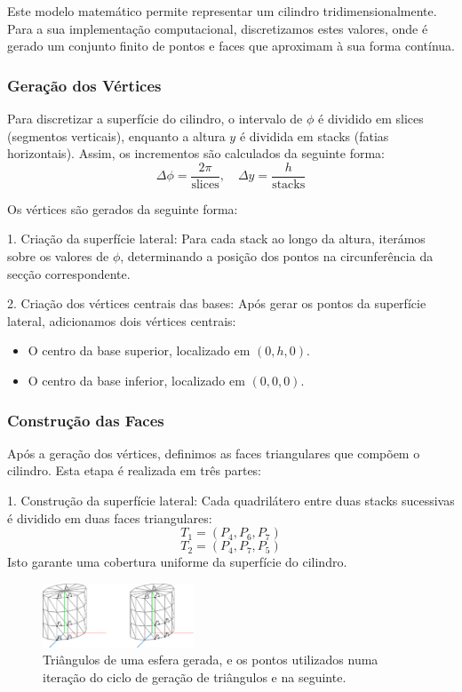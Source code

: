 \documentclass[12pt, a4paper]{article}
\begin{document}
Este modelo matemático permite representar um cilindro tridimensionalmente. Para a sua implementação
computacional, discretizamos estes valores, onde é gerado um conjunto finito de pontos e faces que
aproximam à sua forma contínua.

\subsubsection{Geração dos Vértices}
Para discretizar a superfície do cilindro, o intervalo de \( \phi \) é dividido em slices
(segmentos verticais), enquanto a altura \( y \) é dividida em stacks (fatias horizontais).
Assim, os incrementos são calculados da seguinte forma:
\[
\Delta \phi = \frac{2\pi}{\text{slices}}, \quad \Delta y = \frac{h}{\text{stacks}}
\]

Os vértices são gerados da seguinte forma:

1. Criação da superfície lateral: Para cada stack ao longo da altura, iterámos
sobre os valores de \( \phi \), determinando a posição dos pontos na circunferência da secção
correspondente.

2. Criação dos vértices centrais das bases: Após gerar os pontos da superfície lateral,
adicionamos dois vértices centrais:
\begin{itemize}
\item O centro da base superior, localizado em \( (0, h, 0) \).
\item O centro da base inferior, localizado em \( (0, 0, 0) \).
\end{itemize}

\subsubsection{Construção das Faces}
Após a geração dos vértices, definimos as faces triangulares que compõem o cilindro. Esta etapa
é realizada em três partes:

1. Construção da superfície lateral:
Cada quadrilátero entre duas stacks sucessivas é dividido em duas faces triangulares:
\[
T_1 = (P_4, P_6, P_7)
\]
\[
T_2 = (P_4, P_7, P_5)
\]
Isto garante uma cobertura uniforme da superfície do cilindro.

\begin{figure}[H]
    \centering
    \includegraphics[width=0.4\textwidth]{res/figures/cylinder.pdf}
    \caption{
        Triângulos de uma esfera gerada, e os pontos utilizados numa iteração do ciclo de geração
        de triângulos e na seguinte.
    }
\end{figure}
\end{document}
